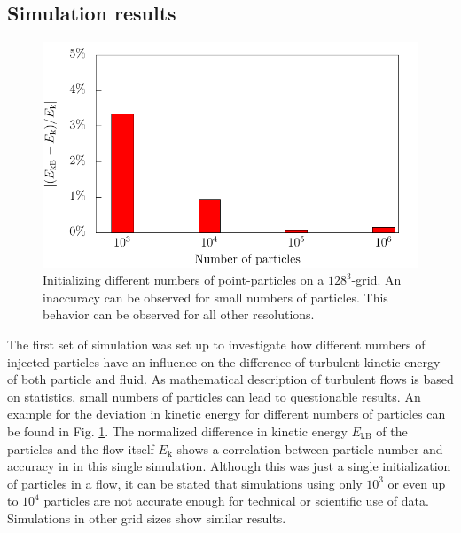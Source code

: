 \documentclass[11pt,a4paper,openany,oneside,parskip=half*]{article}
\begin{document}
\subsection{Simulation results}
\begin{figure}[h]
    \centering
    \begin{minipage}{0.5\textwidth}
        \centering
 	   \includegraphics[width=\linewidth]{./Abbildungen/kineticEnergy_numberOfParticles.pdf}
    \end{minipage}%
        \begin{minipage}{0.5\textwidth}
        \centering
        \caption{Initializing different numbers of point-particles on a $128^3$-grid. An inaccuracy can be observed for small numbers of particles. This behavior can be observed for all other resolutions.}
	\label{kineticEnergy_numberofparticles}
    \end{minipage}
    \end{figure}
The first set of simulation was set up to investigate how different numbers of injected particles have an influence on the difference of turbulent kinetic energy of both particle and fluid. As mathematical description of turbulent flows is based on statistics, small numbers of particles can lead to questionable results. An example for the deviation in kinetic energy for different numbers of particles can be found in Fig. \ref{kineticEnergy_numberofparticles}. The normalized difference in kinetic energy $E_\mathrm{kB}$ of the particles and the flow itself $E_\mathrm{k}$ shows a correlation between particle number and accuracy in in this single simulation. Although this was just a single initialization of particles in a flow, it can be stated that simulations using only $10^3$ or even up to $10^4$ particles are not accurate enough for technical or scientific use of data. Simulations in other grid sizes show similar results.
\end{document}
